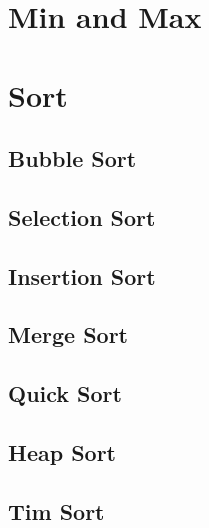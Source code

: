 \section{Min and Max}

\section{Sort}
\subsection{Bubble Sort}\label{lbl-bubblesrt}

\subsection{Selection Sort}\label{lbl-selectionsrt}

\subsection{Insertion Sort}\label{lbl-insertionsrt}

\subsection{Merge Sort}\label{lbl-mergesrt}

\subsection{Quick Sort}\label{lbl-quicksrt}

\subsection{Heap Sort}\label{lbl-heapsrt}

\subsection{Tim Sort}

